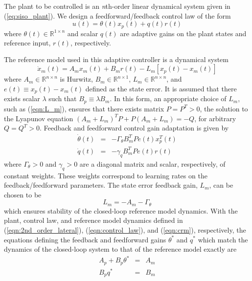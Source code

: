 The plant to be controlled is an \textit{n}th-order linear dynamical system given in (\ref{eq:siso_plant}). We design a feedforward/feedback control law of the form
\begin{equation}
	u(t) = \theta(t) x_p(t) + q(t) r(t)
	\label{eqn:control_law}
\end{equation}
\noindent where $\theta(t) \in \mathbb{R}^{1 \times n}$ and scalar $q(t)$ are adaptive gains on the plant states and reference input, $r(t)$, respectively.

The reference model used in this adaptive controller is a dynamical system 
\begin{equation}
	\dot{x}_m(t) = A_m x_m(t) + B_m r(t) - L_m \left[x_p(t) - x_m(t)\right]
	\label{eqn:crm}
\end{equation} %
\noindent where $A_m \in \mathbb{R}^{n \times n}$ is Hurwitz, $B_m \in \mathbb{R}^{n \times 1}$, $L_m \in \mathbb{R}^{n \times n}$, and $e(t) \equiv x_p(t) - x_m(t)$ defined as the state error. It is assumed that there exists scalar $\lambda$ such that $B_p \equiv \lambda B_m$. In this form, an appropriate choice of $L_m$, such as (\ref{eqn:L_m}), ensures that there exists matrix $P = P^T > 0$, the solution to the Lyapunov equation $(A_m + L_m)^T P + P(A_m + L_m) = - Q$, for arbitrary $Q = Q^T > 0$. Feedback and feedforward control gain adaptation is given by
\begin{eqnarray}
	\dot{\theta}(t) &=& - \Gamma_\theta B_m^T P e(t) x_p^T(t) \label{eqn:adaptive_law_theta}\\
	\dot{q}(t) &=& - \gamma_q B_m^T P e(t) r(t)
	\label{eqn:adaptive_law_gamma}
\end{eqnarray}
\noindent where $\Gamma_\theta > 0$ and $\gamma_q > 0$ are a diagonal matrix and scalar, respectively, of constant weights. These weights correspond to learning rates on the feedback/feedforward parameters. The state error feedback gain, $L_m$, can be chosen to be
\begin{equation}
	L_m = - A_m - \Gamma_\theta
	\label{eqn:L_m}
\end{equation}
\noindent which ensures stability of the closed-loop reference model dynamics. With the plant, control law, and reference model dynamics defined in (\ref{eqn:2nd_order_lateral}), (\ref{eqn:control_law}), and (\ref{eqn:crm}), respectively, the equations defining the feedback and feedforward gains $\theta^*$ and $q^*$ which match the dynamics of the closed-loop system to that of the reference model exactly are 
\begin{eqnarray}
	A_p + B_p \theta^* &=& A_m \label{eqn:matchcond1} \\
	B_p q^* &=& B_m \label{eqn:matchcond2} 
\end{eqnarray}

